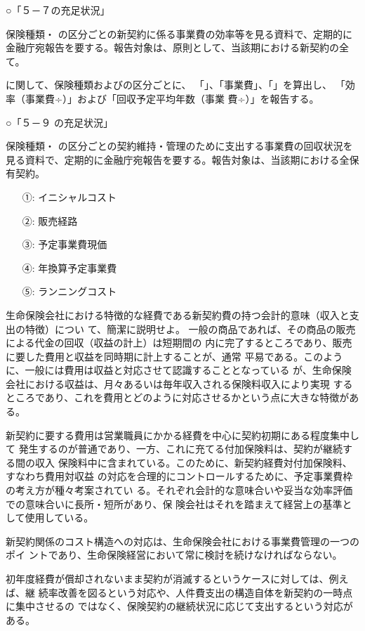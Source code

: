 \documentclass[report,gutter=10mm,fore-edge=10mm,uplatex,dvipdfmx]{jlreq}
\begin{document}
\noindent ○「５－７の充足状況」

保険種類・
の区分ごとの新契約に係る事業費の効率等を見る資料で、定期的に
金融庁宛報告を要する。報告対象は、原則として、当該期における新契約の全て。

に関して、保険種類およびの区分ごとに、
「」、「事業費」、「」を算出し、
「効率（事業費÷）」および「回収予定平均年数（事業
費÷）」を報告する。

\noindent ○「５－９ の充足状況」

保険種類・
の区分ごとの契約維持・管理のために支出する事業費の回収状況を
見る資料で、定期的に金融庁宛報告を要する。報告対象は、当該期における全保有契約。
\answer{}
\begin{itemize}
\item[ ①: ] イニシャルコスト
\item[ ②: ] 販売経路
\item[ ③: ] 予定事業費現価
\item[ ④: ] 年換算予定事業費
\item[ ⑤: ] ランニングコスト
\end{itemize}

生命保険会社における特徴的な経費である新契約費の持つ会計的意味（収入と支出の特徴）につい
て、簡潔に説明せよ。
\answer{}
一般の商品であれば、その商品の販売による代金の回収（収益の計上）は短期間の
内に完了するところであり、販売に要した費用と収益を同時期に計上することが、通常
平易である。このように、一般には費用は収益と対応させて認識することとなっている
が、生命保険会社における収益は、月々あるいは毎年収入される保険料収入により実現
するところであり、これを費用とどのように対応させるかという点に大きな特徴がある。

新契約に要する費用は営業職員にかかる経費を中心に契約初期にある程度集中して
発生するのが普通であり、一方、これに充てる付加保険料は、契約が継続する間の収入
保険料中に含まれている。このために、新契約経費対付加保険料、すなわち費用対収益
の対応を合理的にコントロールするために、予定事業費枠の考え方が種々考案されてい
る。それぞれ会計的な意味合いや妥当な効率評価での意味合いに長所・短所があり、保
険会社はそれを踏まえて経営上の基準として使用している。

新契約関係のコスト構造への対応は、生命保険会社における事業費管理の一つのポイ
ントであり、生命保険経営において常に検討を続けなければならない。

初年度経費が償却されないまま契約が消滅するというケースに対しては、例えば、継
続率改善を図るという対応や、人件費支出の構造自体を新契約の一時点に集中させるの
ではなく、保険契約の継続状況に応じて支出するという対応がある。
\end{document}
